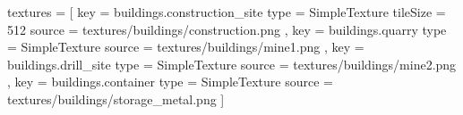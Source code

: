 textures = [
    {
        key         = buildings.construction_site
        type        = SimpleTexture
        tileSize    = 512
        source      = textures/buildings/construction.png
    }, {
        key         = buildings.quarry
        type        = SimpleTexture
        source      = textures/buildings/mine1.png
    }, {
        key         = buildings.drill_site
        type        = SimpleTexture
        source      = textures/buildings/mine2.png
    }, {
        key         = buildings.container
        type        = SimpleTexture
        source      = textures/buildings/storage_metal.png
    }
]